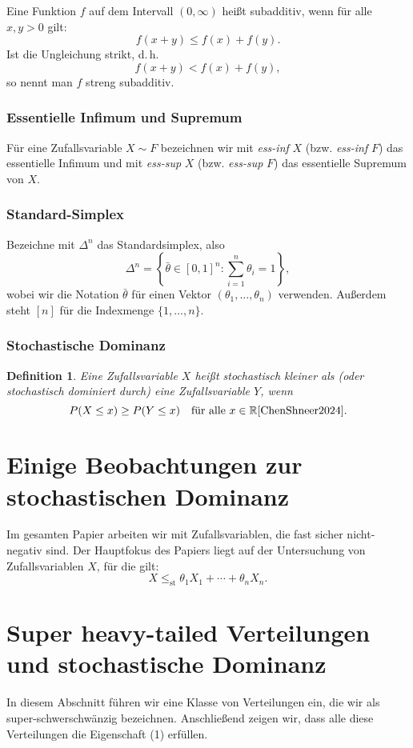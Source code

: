 \documentclass[
12pt,
fancyheadings, %
%
a4paper, 
%
]{tuhhreprt}
\newtheorem{definition}{Definition}[chapter]
\begin{document}
Eine Funktion \( f \) auf dem Intervall \( (0, \infty) \) heißt subadditiv, wenn für alle \( x, y > 0 \) gilt:
\[
f(x + y) \leq f(x) + f(y).
\]
Ist die Ungleichung strikt, d.\,h.
\[
f(x + y) < f(x) + f(y),
\]
so nennt man \( f \) streng subadditiv\cite{ChenShneer2024}.
\subsection{Essentielle Infimum und Supremum}

Für eine Zufallsvariable \( X \sim F \) bezeichnen wir mit \textit{ess-inf} \( X \) (bzw. \textit{ess-inf} \( F \)) das essentielle Infimum und mit \textit{ess-sup} \( X \) (bzw. \textit{ess-sup} \( F \)) das essentielle Supremum von \( X \)\cite{ChenShneer2024}.

\subsection{Standard-Simplex}
Bezeichne mit \(\Delta^n\) das Standardsimplex, also
\[
\Delta^n = \left\{ \bar{\theta} \in [0, 1]^n : \sum_{i=1}^n \theta_i = 1 \right\},
\]
wobei wir die Notation \(\bar{\theta}\) für einen Vektor \((\theta_1, \ldots, \theta_n)\) verwenden. Außerdem steht \([n]\) für die Indexmenge \(\{1, \ldots, n\}\)\cite{ChenShneer2024}.
\subsection{Stochastische Dominanz}
\begin{definition}
Eine Zufallsvariable \( X \) heißt stochastisch kleiner als (oder stochastisch dominiert durch) eine Zufallsvariable \( Y \), wenn
\[
P(X \leq x) \geq P(Y \leq x) \quad \text{für alle } x \in \mathbb{R}\cite{ChenShneer2024}.
\]
\end{definition}

\chapter{Einige Beobachtungen zur stochastischen Dominanz}
Im gesamten Papier arbeiten wir mit Zufallsvariablen, die fast sicher nicht-negativ sind.  
Der Hauptfokus des Papiers liegt auf der Untersuchung von Zufallsvariablen \( X \), für die gilt:  
\begin{equation}
X \leq_{\text{st}} \theta_1 X_1 + \cdots + \theta_n X_n.
\tag{1}
\end{equation}


\chapter{Super heavy-tailed Verteilungen und stochastische Dominanz}
In diesem Abschnitt führen wir eine Klasse von Verteilungen ein, die wir als super-schwerschwänzig bezeichnen. Anschließend zeigen wir, dass alle diese Verteilungen die Eigenschaft (1) erfüllen.












\backmatter
{}


\end{document}
